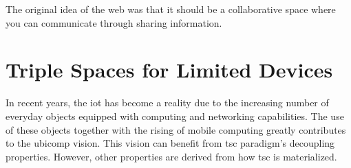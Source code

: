 
\begin{savequote}[50mm]
The original idea of the web was that it should be a collaborative space where you can communicate through sharing information.
\end{savequote}


\newcommand{\codigo}[1]{``\texttt{#1}''}
\newcommand{\primquery}{\emph{query}}
\newcommand{\primread}{\emph{read}}
\newcommand{\primtake}{\emph{take}}
\newcommand{\primwrite}{\emph{write}}

\newcommand{\coordspace}{\emph{coordination space}}
\newcommand{\outerspace}{\emph{outer space}}
\newcommand{\coordinator}{\emph{coordinator}}
\newcommand{\coordinators}{\emph{coordinators}}
\newcommand{\asteroids}{\emph{asteroids}}
\newcommand{\asteroid}{\emph{asteroid}}
\newcommand{\selfgraphs}{\emph{self-managed graphs}}
\newcommand{\osapi}{\emph{OSAPI}}


\chapter{Triple Spaces for Limited Devices}
\label{cha:tsc}

\ifpdf
    \graphicspath{{\pathchapfour/figures/PNG/}{\pathchapfour/figures/PDF/}{\pathchapfour/figures/}}
\else
    \graphicspath{{\pathchapfour/figures/EPS/}{\pathchapfour/figures/}}
\fi









In recent years, the \acf{iot} has become a reality due to the increasing number of everyday objects equipped with computing and networking capabilities.
The use of these objects together with the rising of mobile computing greatly contributes to the \ac{ubicomp} vision.
This vision can benefit from \acf{tsc} paradigm's decoupling properties. %
However, other properties are derived from how \ac{tsc} is materialized. %


